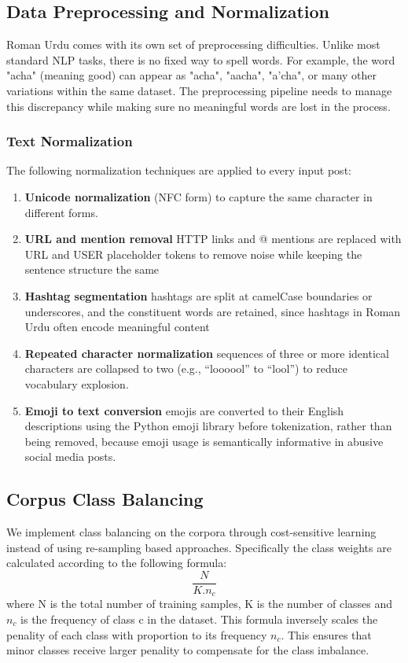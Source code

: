 \documentclass[11pt, a4paper]{article}
\begin{document}
\subsection{Data Preprocessing and Normalization}
Roman Urdu comes with its own set of preprocessing difficulties. Unlike most standard NLP tasks, there is no fixed way to spell words. For example, the word "acha" (meaning good) can appear as "acha", "aacha", "a'cha", or many other variations within the same dataset. The preprocessing pipeline needs to manage this discrepancy while making sure no meaningful words are lost in the process.
\subsubsection{Text Normalization}
The following normalization techniques are applied to every input post:
\begin{enumerate}
\item \textbf{Unicode normalization} (NFC form) to capture the same character in different forms.
\item \textbf{URL and mention removal} HTTP links and @ mentions are replaced with URL and USER placeholder tokens to remove noise while keeping the sentence structure the same
\item \textbf{Hashtag segmentation} hashtags are split at camelCase boundaries or underscores, and the constituent words are retained, since hashtags in Roman Urdu often encode meaningful content
\item \textbf{Repeated character normalization} sequences of three or more identical characters are collapsed to two (e.g., “loooool” to “lool”) to reduce vocabulary explosion.
\item \textbf{Emoji to text conversion} emojis are converted to their English descriptions using the Python emoji library before tokenization, rather than being removed, because emoji usage is semantically informative in abusive social media posts.
\end{enumerate}
\subsection{Corpus Class Balancing}
We implement class balancing on the corpora through cost-sensitive learning instead of using re-sampling based approaches. Specifically the class weights are calculated according to the following formula:
\[\frac{N}{K.n_c}\]
where N is the total number of training samples, K is the number of classes and $n_c$ is the frequency of class c in the dataset. This formula inversely scales the penality of each class with proportion to its frequency $n_c$. This ensures that minor classes receive larger penality to compensate for the class imbalance.
\end{document}
